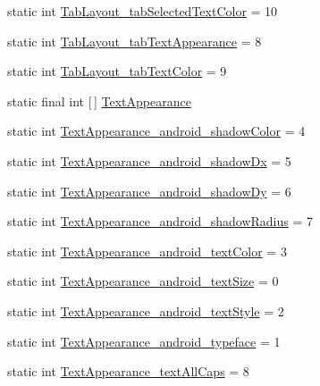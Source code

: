 \begin{DoxyCompactItemize}
\item 
static int \hyperlink{classandroid_1_1support_1_1v4_1_1R_1_1styleable_a1fc04f3779f703c9f532046d056698cd}{Tab\+Layout\+\_\+tab\+Selected\+Text\+Color} = 10
\item 
static int \hyperlink{classandroid_1_1support_1_1v4_1_1R_1_1styleable_aeacf242f27f0a2963e574087838a660b}{Tab\+Layout\+\_\+tab\+Text\+Appearance} = 8
\item 
static int \hyperlink{classandroid_1_1support_1_1v4_1_1R_1_1styleable_a3325892a8a8af0369aea2f77e46cdda0}{Tab\+Layout\+\_\+tab\+Text\+Color} = 9
\item 
static final int \mbox{[}$\,$\mbox{]} \hyperlink{classandroid_1_1support_1_1v4_1_1R_1_1styleable_a81c402d7a6e327c354a1cf72b21fc4f5}{Text\+Appearance}
\item 
static int \hyperlink{classandroid_1_1support_1_1v4_1_1R_1_1styleable_a318e5701b3481a77b72df6e397f667e7}{Text\+Appearance\+\_\+android\+\_\+shadow\+Color} = 4
\item 
static int \hyperlink{classandroid_1_1support_1_1v4_1_1R_1_1styleable_aede7737f192898cea28cfa504def7c4c}{Text\+Appearance\+\_\+android\+\_\+shadow\+Dx} = 5
\item 
static int \hyperlink{classandroid_1_1support_1_1v4_1_1R_1_1styleable_ad8fae45d7f1f386895cd3d3387477bb8}{Text\+Appearance\+\_\+android\+\_\+shadow\+Dy} = 6
\item 
static int \hyperlink{classandroid_1_1support_1_1v4_1_1R_1_1styleable_a6d669faeb8b3585d3807aa0124a6bf14}{Text\+Appearance\+\_\+android\+\_\+shadow\+Radius} = 7
\item 
static int \hyperlink{classandroid_1_1support_1_1v4_1_1R_1_1styleable_ad91d5229f5579d10576dd454b5a76955}{Text\+Appearance\+\_\+android\+\_\+text\+Color} = 3
\item 
static int \hyperlink{classandroid_1_1support_1_1v4_1_1R_1_1styleable_a040fc8f325c7f3437cb0de7391a9f66b}{Text\+Appearance\+\_\+android\+\_\+text\+Size} = 0
\item 
static int \hyperlink{classandroid_1_1support_1_1v4_1_1R_1_1styleable_ad2a5ecd007f593b55beb33c50e15db62}{Text\+Appearance\+\_\+android\+\_\+text\+Style} = 2
\item 
static int \hyperlink{classandroid_1_1support_1_1v4_1_1R_1_1styleable_a9e3a6684a7a098b28524ba5b3ce100f9}{Text\+Appearance\+\_\+android\+\_\+typeface} = 1
\item 
static int \hyperlink{classandroid_1_1support_1_1v4_1_1R_1_1styleable_a1e1460f50d695fa2b57fa98b9d12a63e}{Text\+Appearance\+\_\+text\+All\+Caps} = 8

\end{DoxyCompactItemize}

